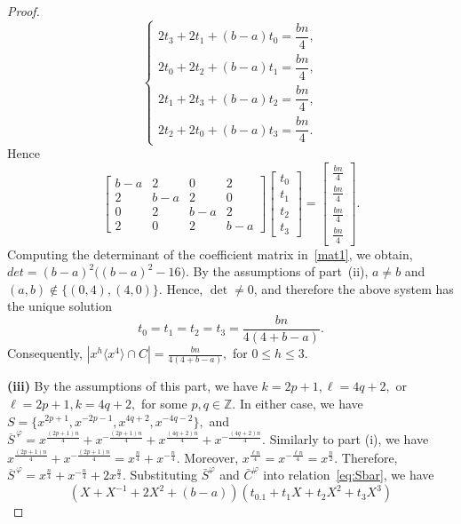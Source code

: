 \documentclass[12pt]{article}
\begin{document}
\begin{proof}
\[
\begin{cases}
	2t_3+2t_1+(b-a)t_0=\dfrac{bn}{4},\\
	2t_0+2t_2+(b-a)t_1=\dfrac{bn}{4},\\
	2t_1+2t_3+(b-a)t_2=\dfrac{bn}{4},\\
	2t_2+2t_0+(b-a)t_3=\dfrac{bn}{4}.
\end{cases}
\]
  Hence
\begin{equation}\label{mat1}
	\begin{bmatrix}
		b-a & 2 & 0 & 2\\
		2 & b-a & 2 & 0\\
		0 & 2 & b-a & 2\\
		2 & 0 & 2 & b-a
	\end{bmatrix}
	\begin{bmatrix}
		t_0\\
		t_1\\
		t_2\\
		t_3
	\end{bmatrix}
	=
	\begin{bmatrix}
		\frac{bn}{4}\\
		\frac{bn}{4}\\
		\frac{bn}{4}\\
		\frac{bn}{4}
	\end{bmatrix}.
\end{equation}
Computing the determinant of the coefficient matrix in~\eqref{mat1}, we obtain, $det=(b-a)^2\bigl((b-a)^2-16\bigr).$ By the assumptions of part~(ii), $a\neq b$ and $(a,b)\notin\{(0,4),(4,0)\}$. Hence, $\det\neq0$, and therefore the above system has the unique solution	
\[
t_0=t_1=t_2=t_3=\frac{bn}{4(4+b-a)}.
\]
Consequently,
$
\left|x^{h}\langle x^{4}\rangle\cap C\right|
=\frac{bn}{4(4+b-a)},$
for $0\le h\le3.$
\par
\indent\textbf{(iii)} By the assumptions of this part, we have
$
k=2p+1, \ell=4q+2,
$
or
$
\ell=2p+1, k=4q+2,
$
for some \(p,q\in\mathbb{Z}\). In either case, we have
$
S=\{x^{2p+1},x^{-2p-1},x^{4q+2},x^{-4q-2}\},
$
and
$
\overline{S}^{\,\varphi}
=
x^{\frac{(2p+1)n}{4}}
+x^{-\frac{(2p+1)n}{4}}
+x^{\frac{(4q+2)n}{4}}
+x^{-\frac{(4q+2)n}{4}}.
$ Similarly to part (i), we have $
x^{\frac{(2p+1)n}{4}}
+x^{-\frac{(2p+1)n}{4}}
=
x^{\frac{n}{4}}+x^{-\frac{n}{4}}.
$ Moreover, $x^{\frac{\ell n}{4}}=x^{-\frac{\ell n}{4}}=x^{\frac{n}{2}}$. Therefore, $\overline{S}^{\,\varphi}=x^{\frac{n}{4}}+x^{-\frac{n}{4}}+2x^{\frac{n}{2}}$. Substituting \(\bar{S}^{\varphi}\) and $\bar{C}^{\varphi}$ into relation~\eqref{eq:Sbar}, we have
 \[
(X + X^{-1} + 2X^{2} + (b-a))(t_0.1 + t_1X + t_2X^2 + t_3X^3)
\]
\end{proof}
\end{document}
